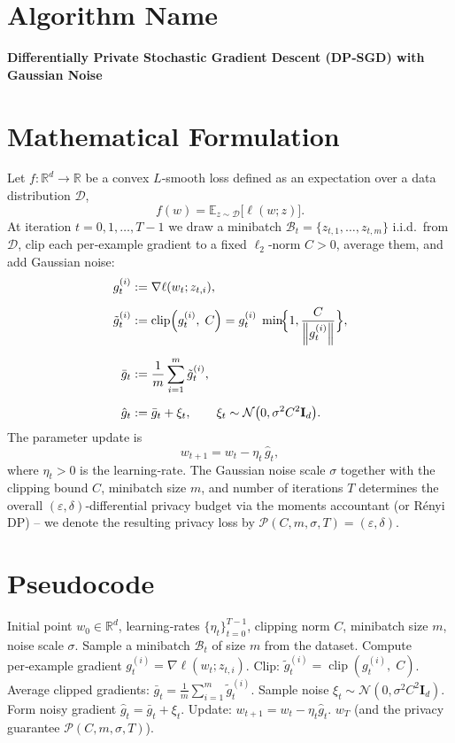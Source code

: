 \documentclass[11pt]{article}
\newcommand{\E}{\mathbb{E}}
\newcommand{\R}{\mathbb{R}}
\newcommand{\norm}[1]{\left\|#1\right\|}
\newcommand{\clip}[2]{\operatorname{clip}\!\left(#1,\;#2\right)}
\begin{document}
\section*{Algorithm Name}
\textbf{Differentially Private Stochastic Gradient Descent (DP‑SGD) with Gaussian Noise}

\section*{Mathematical Formulation}
Let $f:\R^{d}\rightarrow\R$ be a convex $L$‑smooth loss defined as an expectation over a data distribution $\mathcal{D}$,
\[
f(w)=\E_{z\sim\mathcal{D}}\big[\ell(w;z)\big].
\]
At iteration $t=0,1,\dots,T-1$ we draw a minibatch $\mathcal{B}_{t}=\{z_{t,1},\dots ,z_{t,m}\}$ i.i.d.\ from $\mathcal{D}$, clip each per‑example gradient to a fixed $\ell_{2}$‑norm $C>0$, average them, and add Gaussian noise:
\[
\begin{aligned}
g_{t}^{(i)} &:= \nabla\ell(w_{t};z_{t,i}),\\[2mm]
\tilde g_{t}^{(i)} &:= \clip{g_{t}^{(i)}}{C}
          = g_{t}^{(i)}\;\min\!\Bigl\{1,\frac{C}{\norm{g_{t}^{(i)}}}\Bigr\},\\[2mm]
\bar g_{t} &:= \frac{1}{m}\sum_{i=1}^{m}\tilde g_{t}^{(i)},\\[2mm]
\hat g_{t} &:= \bar g_{t}+ \xi_{t},\qquad 
\xi_{t}\sim\mathcal{N}\bigl(0,\sigma^{2}C^{2}\mathbf{I}_{d}\bigr). 
\end{aligned}
\]
The parameter update is
\[
w_{t+1}= w_{t}-\eta_{t}\,\hat g_{t},
\]
where $\eta_{t}>0$ is the learning‑rate.  
The Gaussian noise scale $\sigma$ together with the clipping bound $C$, minibatch size $m$, and number of iterations $T$ determines the overall $(\varepsilon,\delta)$‑differential privacy budget via the moments accountant (or Rényi DP) – we denote the resulting privacy loss by $\mathcal{P}(C,m,\sigma,T)=(\varepsilon,\delta)$.

\section*{Pseudocode}
\begin{algorithm}[H]
\caption{DP‑SGD with Gaussian Noise}
\begin{algorithmic}[1]
\REQUIRE Initial point $w_{0}\in\R^{d}$, learning‑rates $\{\eta_{t}\}_{t=0}^{T-1}$,
          clipping norm $C$, minibatch size $m$, noise scale $\sigma$.
    \STATE Sample a minibatch $\mathcal{B}_{t}$ of size $m$ from the dataset.
        \STATE Compute per‑example gradient $g_{t}^{(i)}=\nabla\ell(w_{t};z_{t,i})$.
        \STATE Clip: $\tilde g_{t}^{(i)}= \clip{g_{t}^{(i)}}{C}$.
    \ENDFOR
    \STATE Average clipped gradients: $\bar g_{t}= \frac{1}{m}\sum_{i=1}^{m}\tilde g_{t}^{(i)}$.
    \STATE Sample noise $\xi_{t}\sim\mathcal{N}(0,\sigma^{2}C^{2}\mathbf{I}_{d})$.
    \STATE Form noisy gradient $\hat g_{t}= \bar g_{t}+ \xi_{t}$.
    \STATE Update: $w_{t+1}= w_{t}-\eta_{t}\hat g_{t}$.
\ENDFOR
\RETURN $w_{T}$ (and the privacy guarantee $\mathcal{P}(C,m,\sigma,T)$).
\end{algorithmic}
\end{algorithm}
\end{document}

